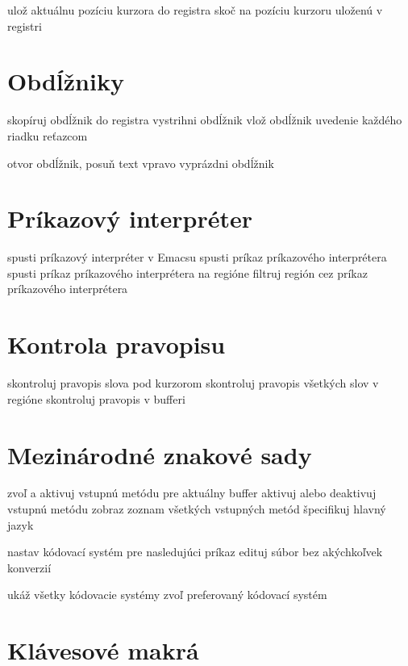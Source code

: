  ulož aktuálnu pozíciu kurzora do registra
 skoč na pozíciu kurzoru uloženú v registri

\section{Obdĺžniky}

 skopíruj obdĺžnik do registra
 vystrihni obdĺžnik
 vlož obdĺžnik
 uvedenie každého riadku reťazcom

 otvor obdĺžnik, posuň text vpravo
 vyprázdni obdĺžnik

\section{Príkazový interpréter}

 spusti príkazový interpréter v Emacsu
 spusti príkaz príkazového interprétera
 spusti príkaz príkazového interprétera na regióne
 filtruj región cez príkaz príkazového interprétera

\section{Kontrola pravopisu}

 skontroluj pravopis slova pod kurzorom
 skontroluj pravopis všetkých slov v regióne
 skontroluj pravopis v bufferi

\section{Mezinárodné znakové sady}

 zvoľ a aktivuj vstupnú metódu pre aktuálny buffer
 aktivuj alebo deaktivuj vstupnú metódu
 zobraz zoznam všetkých vstupných metód
 špecifikuj hlavný jazyk

 nastav kódovací systém pre nasledujúci príkaz
 edituj súbor bez akýchkoľvek konverzií

 ukáž všetky kódovacie systémy
 zvoľ preferovaný kódovací systém

\section{Klávesové makrá}

